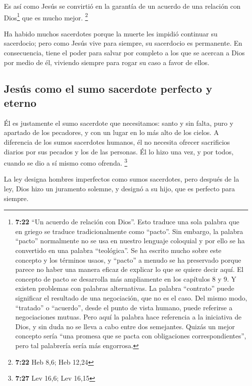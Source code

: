  Es así como Jesús se convirtió en la garantía de un
acuerdo de una relación con Dios\footnote{\textbf{7:22} ``Un acuerdo de
  relación con Dios''. Esto traduce una sola palabra que en griego se
  traduce tradicionalmente como ``pacto''. Sin embargo, la palabra
  ``pacto'' normalmente no se usa en nuestro lenguaje coloquial y por
  ello se ha convertido en una palabra ``teológica''. Se ha escrito
  mucho sobre este concepto y los términos usaos, y ``pacto'' a menudo
  se ha preservado porque parece no haber una manera eficaz de explicar
  lo que se quiere decir aquí. El concepto de pacto se desarrolla más
  ampliamente en los capítulos 8 y 9. Y existen problemas con palabras
  alternativas. La palabra ``contrato'' puede significar el resultado de
  una negociación, que no es el caso. Del mismo modo, ``tratado'' o
  ``acuerdo'', desde el punto de vista humano, puede referirse a
  negociaciones mutuas. Pero aquí la palabra hace referencia a la
  iniciativa de Dios, y sin duda no se lleva a cabo entre dos
  semejantes. Quizás un mejor concepto sería ``una promesa que se pacta
  con obligaciones correspondientes'', pero tal palabrería sería más
  engorrosa.} que es mucho mejor. \footnote{\textbf{7:22} Heb 8,6; Heb
  12,24}

 Ha habido muchos sacerdotes porque la muerte les impidió
continuar su sacerdocio;  pero como Jesús vive para
siempre, su sacerdocio es permanente.  En consecuencia,
tiene el poder para salvar por completo a los que se acercan a Dios por
medio de él, viviendo siempre para rogar su caso a favor de ellos.

\hypertarget{jesuxfas-como-el-sumo-sacerdote-perfecto-y-eterno}{%
\subsection{Jesús como el sumo sacerdote perfecto y
eterno}\label{jesuxfas-como-el-sumo-sacerdote-perfecto-y-eterno}}

 Él es justamente el sumo sacerdote que necesitamos:
santo y sin falta, puro y apartado de los pecadores, y con un lugar en
lo más alto de los cielos.  A diferencia de los sumos
sacerdotes humanos, él no necesita ofrecer sacrificios diarios por sus
pecados y los de las personas. Él lo hizo una vez, y por todos, cuando
se dio a sí mismo como ofrenda. \footnote{\textbf{7:27} Lev 16,6; Lev
  16,15}

 La ley designa hombres imperfectos como sumos
sacerdotes, pero después de la ley, Dios hizo un juramento solemne, y
designó a su hijo, que es perfecto para siempre.

